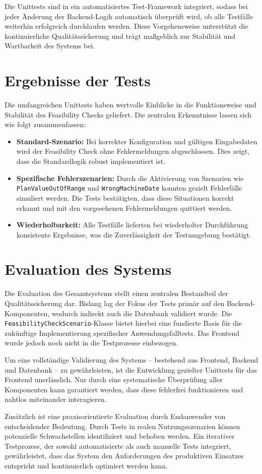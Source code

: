 Die Unittests sind in ein automatisiertes Test-Framework integriert, sodass bei jeder Änderung der Backend-Logik automatisch überprüft wird, ob alle Testfälle weiterhin erfolgreich durchlaufen werden. Diese Vorgehensweise unterstützt die kontinuierliche Qualitätssicherung und trägt maßgeblich zur Stabilität und Wartbarkeit des Systems bei.

\section{Ergebnisse der Tests}

Die umfangreichen Unittests haben wertvolle Einblicke in die Funktionsweise und Stabilität des Feasibility Checks geliefert. Die zentralen Erkenntnisse lassen sich wie folgt zusammenfassen:

\begin{itemize}
    \item \textbf{Standard-Szenario:} Bei korrekter Konfiguration und gültigen Eingabedaten wird der Feasibility Check ohne Fehlermeldungen abgeschlossen. Dies zeigt, dass die Standardlogik robust implementiert ist.
    \item \textbf{Spezifische Fehlerszenarien:} Durch die Aktivierung von Szenarien wie \linebreak\texttt{PlanValueOutOfRange} und \texttt{WrongMachineDate} konnten gezielt Fehlerfälle simuliert werden. Die Tests bestätigten, dass diese Situationen korrekt erkannt und mit den vorgesehenen Fehlermeldungen quittiert werden.
    \item \textbf{Wiederholbarkeit:} Alle Testfälle lieferten bei wiederholter Durchführung konsistente Ergebnisse, was die Zuverlässigkeit der Testumgebung bestätigt.
\end{itemize}


\section{Evaluation des Systems}

Die Evaluation des Gesamtsystems stellt einen zentralen Bestandteil der Qualitätssicherung dar. Bislang lag der Fokus der Tests primär auf den Backend-Komponenten, wodurch indirekt auch die Datenbank validiert wurde. Die \texttt{FeasibilityCheckScenario}-Klasse bietet hierbei eine fundierte Basis für die zukünftige Implementierung spezifischer Anwendungsfalltests. Das Frontend wurde jedoch noch nicht in die Testprozesse einbezogen.

Um eine vollständige Validierung des Systems – bestehend aus Frontend, Backend und Datenbank – zu gewährleisten, ist die Entwicklung gezielter Unittests für das Frontend unerlässlich. Nur durch eine systematische Überprüfung aller Komponenten kann garantiert werden, dass diese fehlerfrei funktionieren und nahtlos miteinander interagieren.

Zusätzlich ist eine praxisorientierte Evaluation durch Endanwender von entscheidender Bedeutung. Durch Tests in realen Nutzungsszenarien können potenzielle Schwachstellen identifiziert und behoben werden. Ein iterativer Testprozess, der sowohl automatisierte als auch manuelle Tests integriert, gewährleistet, dass das System den Anforderungen des produktiven Einsatzes entspricht und kontinuierlich optimiert werden kann.
